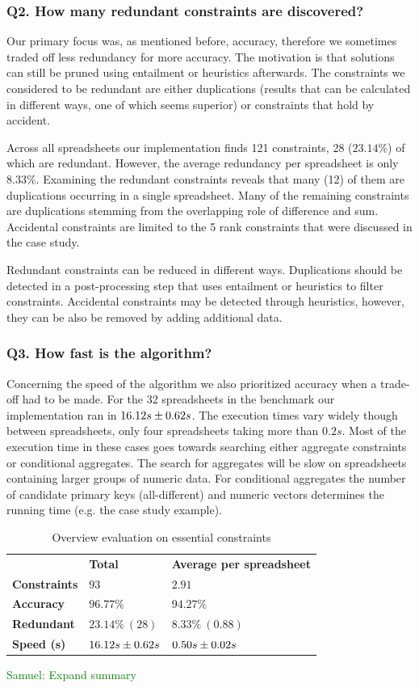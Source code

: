 \documentclass{sig-alternate-05-2015}
\newcommand{\samuel}[1]{\textcolor{green}{{\sc Samuel:} #1}\xspace}
\begin{document}
\subsubsection*{Q2. How many redundant constraints are discovered?}
Our primary focus was, as mentioned before, accuracy, therefore we sometimes traded off less redundancy for more accuracy.
The motivation is that solutions can still be pruned using entailment or heuristics afterwards.
The constraints we considered to be redundant are either duplications (results that can be calculated in different ways, one of which seems superior) or constraints that hold by accident.

Across all spreadsheets our implementation finds 121 constraints, 28 ($23.14\%$) of which are redundant.
However, the average redundancy per spreadsheet is only $8.33\%$.
Examining the redundant constraints reveals that many (12) of them are duplications occurring in a single spreadsheet.
Many of the remaining constraints are duplications stemming from the overlapping role of difference and sum.
Accidental constraints are limited to the 5 rank constraints that were discussed in the case study.

Redundant constraints can be reduced in different ways.
Duplications should be detected in a post-processing step that uses entailment or heuristics to filter constraints.
Accidental constraints may be detected through heuristics, however, they can be also be removed by adding additional data.

\subsubsection*{Q3. How fast is the algorithm?}
Concerning the speed of the algorithm we also prioritized accuracy when a trade-off had to be made.
For the 32 spreadsheets in the benchmark our implementation ran in ${16.12}s \pm {0.62}s$.
The execution times vary widely though between spreadsheets, only four spreadsheets taking more than $0.2s$.
Most of the execution time in these cases goes towards searching either aggregate constraints or conditional aggregates.
The search for aggregates will be slow on spreadsheets containing larger groups of numeric data.
For conditional aggregates the number of candidate primary keys (all-different) and numeric vectors determines the running time (e.g. the case study example).

\begin{table}
  \centering
  \begin{tabular}{lll}
    & \textbf{Total} & \textbf{Average per spreadsheet} \\
    \textbf{Constraints} & $93$ & $2.91$ \\
    \textbf{Accuracy} & $96.77\%$ & $94.27\%$ \\
    \textbf{Redundant} & $23.14\%~(28)$ & $8.33\%~(0.88)$ \\
    \textbf{Speed (s)} & ${16.12}s \pm {0.62}s$ & ${0.50}s \pm {0.02}s$
  \end{tabular}
  \caption{Overview evaluation on essential constraints}
\end{table}
\samuel{Expand summary}
\end{document}
